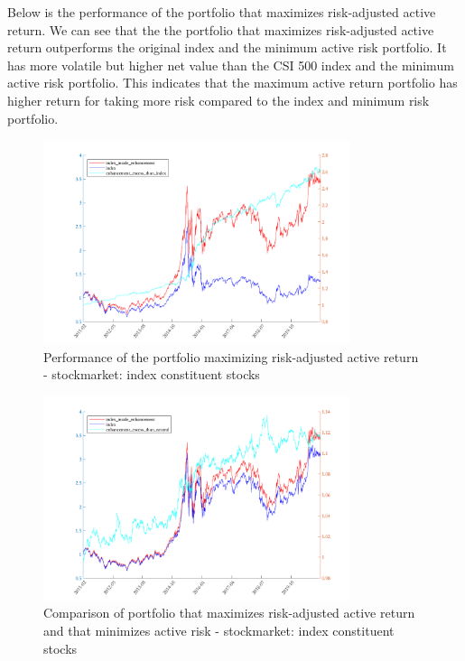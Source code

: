 \documentclass[10pt]{article}
\begin{document}
Below is the performance of the portfolio that maximizes risk-adjusted active return. We can see that the the portfolio that maximizes risk-adjusted active return outperforms the original index and the minimum active risk portfolio. It has more volatile but higher net value than the CSI 500 index and the minimum active risk portfolio. This indicates that the maximum active return portfolio has higher return for taking more risk compared to the index and minimum risk portfolio.

\begin{figure}[H]
    \centering
     \includegraphics[width=0.8\textwidth]{inside_enhancement_than_index.png}
    \caption{Performance of the portfolio maximizing risk-adjusted active return - stockmarket: index constituent stocks}
    \label{fig:Fig14}
\end{figure}

\begin{figure}[H]
    \centering
     \includegraphics[width=0.8\textwidth]{inside_enhancement_than_neutral.png}
    \caption{Comparison of portfolio that maximizes risk-adjusted active return and that minimizes active risk - stockmarket: index constituent stocks}
    \label{fig:Fig15}
\end{figure}
\end{document}
